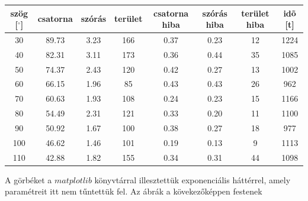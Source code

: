 \documentclass[a4paper,12pt]{article}
\begin{document}
\begin{center}
\begin{tabular}{|c|c|c|c|c|c|c|c|}
\hline
szög [$^{\circ}$] & csatorna & szórás & terület & csatorna hiba & szórás hiba & terület hiba & idõ [t] \\
\hline
30 & 89.73 & 3.23 & 166 & 0.37 & 0.23 & 12 & 1224 \\
\hline
40 & 82.31 & 3.11 & 173 & 0.36& 0.44 & 35 & 1085 \\
\hline
50 & 74.37 & 2.43 & 120 & 0.42 & 0.27 & 13 & 1002 \\
\hline
60 & 66.15 & 1.96 & 85 & 0.43 & 0.43 & 26 & 962 \\
\hline
70 & 60.63 & 1.93 & 108 & 0.24 & 0.23 & 15 & 1166 \\
\hline
80 & 54.49 & 2.31 & 121 & 0.33 & 0.20 & 11 & 1100 \\
\hline
90 & 50.92 & 1.67 & 100 & 0.38 & 0.27 & 18 & 977 \\
\hline
100 & 46.62 & 1.46 & 101 & 0.19 & 0.13 & 9 & 1113 \\
\hline
110 & 42.88 & 1.82 & 155 & 0.34 & 0.31 & 44 & 1098 \\
\hline

\end{tabular}
\end{center}

\par A görbéket a $matplotlib$ könyvtárral illesztettük exponenciális háttérrel, amely paramétreit itt nem tűntettük fel. Az ábrák a kövekezőképpen festenek
\end{document}
